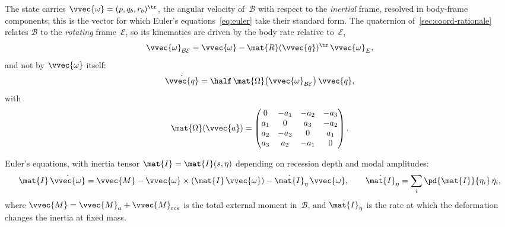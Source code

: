 The state carries $\vvec{\omega} = (p,q_b,r_b)^\tr$, the angular velocity
of~$\mathcal{B}$ with respect to the \emph{inertial} frame, resolved in
body-frame components; this is the vector for which Euler's
equations~\cref{eq:euler} take their standard form. The quaternion
of~\cref{sec:coord-rationale} relates $\mathcal{B}$ to the \emph{rotating}
frame~$\mathcal{E}$, so its kinematics are driven by the body rate relative
to~$\mathcal{E}$,
\begin{equation}\label{eq:omega-rel}
  \vvec{\omega}_{\mathcal{B}\mathcal{E}}
  = \vvec{\omega} - \mat{R}(\vvec{q})^\tr\,\vvec{\omega}_E ,
\end{equation}
and not by $\vvec{\omega}$ itself:
\begin{equation}\label{eq:qdot}
  \dot{\vvec{q}}
  = \half\,\mat{\Omega}\bigl(\vvec{\omega}_{\mathcal{B}\mathcal{E}}\bigr)\,
    \vvec{q},
\end{equation}
with
\begin{equation}\label{eq:Omega}
  \mat{\Omega}(\vvec{a})
  = \begin{pmatrix}
      0    & -a_1 & -a_2 & -a_3\\
      a_1  &  0   &  a_3 & -a_2\\
      a_2  & -a_3 &  0   &  a_1\\
      a_3  &  a_2 & -a_1 &  0
    \end{pmatrix}.
\end{equation}

Euler's equations, with inertia tensor
$\mat{I} = \mat{I}(s,\eta)$ depending on recession depth and modal
amplitudes:
\begin{equation}\label{eq:euler}
  \mat{I}\,\dot{\vvec{\omega}}
  = \vvec{M} - \vvec{\omega}\times(\mat{I}\,\vvec{\omega})
    - \dot{\mat{I}}_{\eta}\,\vvec{\omega},
  \qquad
  \dot{\mat{I}}_{\eta} = \sum_{i}\pd{\mat{I}}{\eta_i}\,\dot\eta_i ,
\end{equation}
where $\vvec{M} = \vvec{M}_a + \vvec{M}_{\mathrm{rcs}}$ is the total
external moment in~$\mathcal{B}$, and $\dot{\mat{I}}_{\eta}$ is the rate at
which the deformation changes the inertia at fixed mass.

